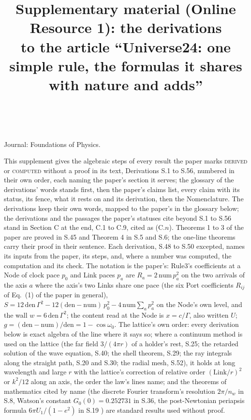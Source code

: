 \documentclass[pdflatex,sn-mathphys-num]{sn-jnl}
\newcommand{\num}{\mathrm{num}}
\newcommand{\den}{\mathrm{den}}
\theoremstyle{thmstyleone}
\begin{document}
\title{Supplementary material (Online Resource 1): the derivations\\ \large to the article ``Universe24: one simple rule, the formulas it shares with nature and adds''}
\author*{ \,}
\maketitle

\noindent Journal: Foundations of Physics.


\noindent This supplement gives the algebraic steps of every result the paper marks \textsc{derived} or \textsc{computed} without a proof in its text, Derivations S.1 to S.56, numbered in their own order, each naming the paper's section it serves; the glossary of the derivations' words stands first, then the paper's claims list, every claim with its status, its fence, what it rests on and its derivation, then the Nomenclature. The derivations keep their own words, mapped to the paper's in the glossary below; the derivations and the passages the paper's statuses cite beyond S.1 to S.56 stand in Section C at the end, C.1 to C.9, cited as (C.$n$). Theorems 1 to 3 of the paper are proved in S.45 and Theorem 4 in S.5 and S.6; the one-line theorems carry their proof in their sentence. Each derivation, S.48 to S.50 excepted, names its inputs from the paper, its steps, and, where a number was computed, the computation and its check. The notation is the paper's: Rule3's coefficients at a Node of clock pace $p_0$ and Link paces $p_a$ are $R_a = 2\,\num\,p_a^2$ on the two arrivals of the axis $a$ where the axis's two Links share one pace (the six Port coefficients $R_{ij}$ of Eq.~(1) of the paper in general), $S = 12\,\den\,\Gamma^2 - 12(\den - \num)\,p_0^2 - 4\,\num\sum_a p_a^2$ on the Node's own level, and the wall $w = 6\,\den\,\Gamma^2$; the content read at the Node is $x = c / \Gamma$, also written $U$; $g = (\den - \num) / \den = 1 - \cos\omega_0$. The lattice's own order: every derivation below is exact algebra of the line where it says so; where a continuum method is used on the lattice (the far field $3 / (4\pi r)$ of a holder's rest, S.25; the retarded solution of the wave equation, S.40; the shell theorem, S.29; the ray integrals along the straight path, S.20 and S.30; the radial mesh, S.52), it holds at long wavelength and large $r$ with the lattice's correction of relative order $(\mathrm{Link} / r)^2$ or $k^2 / 12$ along an axis, the order the law's lines name; and the theorems of mathematics cited by name (the discrete Fourier transform's resolution $2\pi / n_w$ in S.8, Watson's constant $G_0(0) = 0.252731$ \cite{watson} in S.36, the post-Newtonian periapsis formula $6\pi U_1 / (1 - e^2)$ in S.19 \cite{will}) are standard results used without proof.
\end{document}
